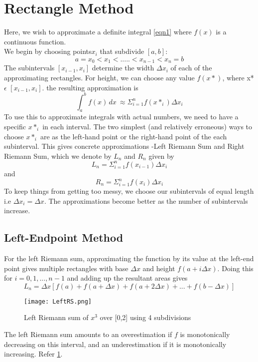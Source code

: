 \documentclass[a4paper, 12pt]{report}
\begin{document}
    \section{Rectangle Method}
    Here, we wish to approximate a definite integral \ref{eqn1} where $f(x)$ is a continuous function. \\
    We begin by choosing points{$x_{i}$} that subdivide $[a,b]$:
    \begin{equation}
        a = x_{0}<x_{1}<.....<x_{n-1}<x_{n} = b
    \end{equation}
    The subintervals $[x_{i-1},x_{i}]$ determine the width $\Delta x_{i}$ of each of the approximating rectangles. For height, we can choose any value $f(x*)$, where x* $\epsilon$ $[x_{i-1},x_{i}]$. the resulting approximation is 
    \begin{equation}
         \int_{a}^{b} f(x)\,dx\  \approx \Sigma_{i=1}^{n} f(x*_{i}) \Delta x_{i}
    \end{equation}
    To use this to approximate integrals with actual numbers, we need to have a specific $x*_{i}$ in each interval. The two simplest (and relatively erroneous) ways to choose $x*_{i}$ are as the left-hand point or the right-hand point of the each subinterval. This gives concrete approximations -Left Riemann Sum and Right Riemann Sum, which we denote by $L_{n}$ and $R_{n}$ given by 
    \begin{equation}
        L_{n} = \Sigma_{i=1}^{n} f(x_{i-1}) \Delta x_{i}
    \end{equation}
    and 
     \begin{equation}
        R_{n} = \Sigma_{i=1}^{n} f(x_{i}) \Delta x_{i}
    \end{equation}
    To keep things from getting too messy, we choose our subintervals of equal length i.e $\Delta x_{i} = \Delta x$. The approximations become better as the number of subintervals increase.
    \subsection{Left-Endpoint Method}
    For the left Riemann sum, approximating the function by its value at the left-end point gives multiple rectangles with base $\Delta x$ and height $f(a+i\Delta x)$. Doing this for $i = 0,1,...,n-1$ and adding up the resultant areas gives
    \begin{equation}
        L_{n} = \Delta x[f(a) + f(a+\Delta x) + f(a+2\Delta x) + ...+ f(b-\Delta x)]
    \end{equation}
    \begin{figure}[h]
    \centering
    \texttt{[image: LeftRS.png]}
    \caption{Left Riemann sum of $x^{3}$ over [0,2] using 4 subdivisions}
    \label{fig:LeftRS}
    \end{figure}
    The left Riemann sum amounts to an overestimation if $f$ is monotonically decreasing on this interval, and an underestimation if it is monotonically increasing. Refer \ref{fig:LeftRS}.
\end{document}
